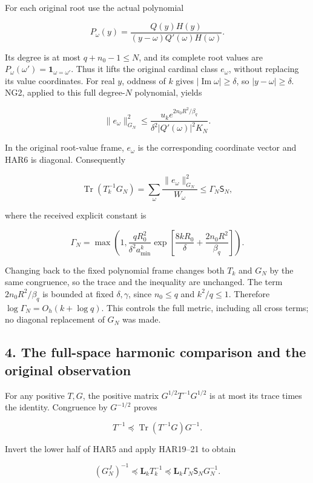 \documentclass[11pt]{article}
\begin{document}
For each original root use the actual polynomial

\[
P_\omega(y)=\frac{Q(y)H(y)}{(y-\omega)Q'(\omega)H(\omega)}.
\tag{HAR17}
\]

Its degree is at most \(q+n_0-1\le N\), and its complete root values are \(P_\omega(\omega')=\mathbf1_{\omega=\omega'}\). Thus it lifts the original cardinal class \(e_\omega\), without replacing its value coordinates. For real \(y\), oddness of \(k\) gives \(|\operatorname{Im}\omega|\ge\delta\), so \(|y-\omega|\ge\delta\). NG2, applied to this full degree-\(N\) polynomial, yields

\[
\|e_\omega\|_{G_N}^2\le
\frac{u_k e^{2n_0R^2/\beta_q}}{\delta^2|Q'(\omega)|^2K_N}.
\tag{HAR18}
\]

In the original root-value frame, \(e_\omega\) is the corresponding coordinate vector and HAR6 is diagonal. Consequently

\[
\operatorname{Tr}(T_k^{-1}G_N)
=\sum_\omega\frac{\|e_\omega\|_{G_N}^2}{W_\omega}
\le\Gamma_N\mathsf S_N,
\tag{HAR19}
\]

where the received explicit constant is

\[
\boxed{\Gamma_N=
\max\left(1,\frac{qR_0^2}{\delta^2a_{\min}^k}
\exp\left[\frac{8kR_0}{\delta}+
\frac{2n_0R^2}{\beta_q}\right]\right).}
\tag{HAR20}
\]

Changing back to the fixed polynomial frame changes both \(T_k\) and \(G_N\) by the same congruence, so the trace and the inequality are unchanged. The term \(2n_0R^2/\beta_q\) is bounded at fixed \(\delta,\gamma\), since \(n_0\le q\) and \(k^2/q\le1\). Therefore \(\log\Gamma_N=O_h(k+\log q)\). This controls the full metric, including all cross terms; no diagonal replacement of \(G_N\) was made.

\subsection{4. The full-space harmonic comparison and the original observation}\label{the-full-space-harmonic-comparison-and-the-original-observation}

For any positive \(T,G\), the positive matrix \(G^{1/2}T^{-1}G^{1/2}\) is at most its trace times the identity. Congruence by \(G^{-1/2}\) proves

\[
T^{-1}\preceq\operatorname{Tr}(T^{-1}G)G^{-1}.
\tag{HAR21}
\]

Invert the lower half of HAR5 and apply HAR19--21 to obtain

\[
(G_N^J)^{-1}\preceq\mathbf L_kT_k^{-1}
\preceq\mathbf L_k\Gamma_N\mathsf S_NG_N^{-1}.
\]
\end{document}
